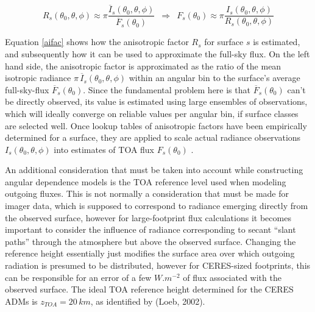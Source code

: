 \documentclass[12pt]{article}
\begin{document}
    \begin{equation}\label{aifac}
        R_s(\theta_0, \theta, \phi) \approx \pi\frac{\overline{I}_s(\theta_0, \theta, \phi)}{\overline{F}_s(\theta_0) } \,\,\, \Rightarrow \,\,\,
         F_s(\theta_0) \approx \pi\frac{I_s(\theta_0, \theta, \phi)}{R_s(\theta_0, \theta, \phi)}
    \end{equation}

    Equation \ref{aifac} shows how the anisotropic factor $R_s$ for surface $s$ is estimated, and subsequently how it can be used to approximate the full-sky flux. On the left hand side, the anisotropic factor is approximated as the ratio of the mean isotropic radiance $\pi\,\overline{I}_s(\theta_0, \theta, \phi)$ within an angular bin to the surface's average full-sky-flux $\overline{F}_s(\theta_0)$. Since the fundamental problem here is that $\overline{F}_s(\theta_0)$ can't be directly observed, its value is estimated using large ensembles of observations, which will ideally converge on reliable values per angular bin, if surface classes are selected well. Once lookup tables of anisotropic factors have been empirically determined for a surface, they are applied to scale actual radiance observations $I_s(\theta_0, \theta, \phi)$ into estimates of TOA flux $F_s(\theta_0)$ \cite{suttles_angular_1988}\cite{su_next-generation_2015}\cite{loeb_angular_2005}.

    An additional consideration that must be taken into account while constructing angular dependence models is the TOA reference level used when modeling outgoing fluxes. This is not normally a consideration that must be made for imager data, which is supposed to correspond to radiance emerging directly from the observed surface, however for large-footprint flux calculations it becomes important to consider the influence of radiance corresponding to secant ``slant paths'' through the atmosphere but above the observed surface. Changing the reference height essentially just modifies the surface area over which outgoing radiation is presumed to be distributed, however for CERES-sized footprints, this can be responsible for an error of a few $\si{W.m^{-2}}$ of flux associated with the observed surface. The ideal TOA reference height determined for the CERES ADMs is $z_{TOA} = 20\,\si{km}$, as identified by (Loeb, 2002)\cite{loeb_defining_2002}.
\end{document}
